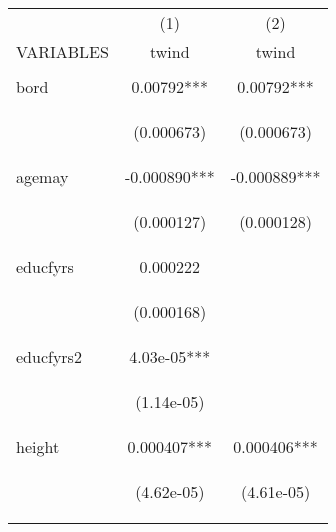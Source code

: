 \documentclass[]{article}
\begin{document}
\begin{center}
\begin{tabular}{lcc} \hline
 & (1) & (2) \\
VARIABLES & twind & twind \\ \hline
\vspace{4pt} & \begin{footnotesize}\end{footnotesize} & \begin{footnotesize}\end{footnotesize} \\
bord & 0.00792*** & 0.00792*** \\
\vspace{4pt} & \begin{footnotesize}(0.000673)\end{footnotesize} & \begin{footnotesize}(0.000673)\end{footnotesize} \\
agemay & -0.000890*** & -0.000889*** \\
\vspace{4pt} & \begin{footnotesize}(0.000127)\end{footnotesize} & \begin{footnotesize}(0.000128)\end{footnotesize} \\
educfyrs & 0.000222 &  \\
\vspace{4pt} & \begin{footnotesize}(0.000168)\end{footnotesize} & \begin{footnotesize}\end{footnotesize} \\
educfyrs2 & 4.03e-05*** &  \\
\vspace{4pt} & \begin{footnotesize}(1.14e-05)\end{footnotesize} & \begin{footnotesize}\end{footnotesize} \\
height & 0.000407*** & 0.000406*** \\
\vspace{4pt} & \begin{footnotesize}(4.62e-05)\end{footnotesize} & \begin{footnotesize}(4.61e-05)\end{footnotesize} \\

\end{tabular}
\end{center}
\end{document}
